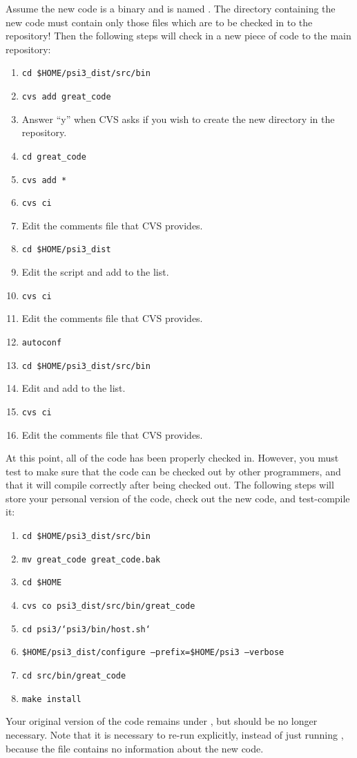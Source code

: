Assume the new code is a binary and is named . The directory
containing the new code must contain only those files which are to be checked
in to the repository! Then the following steps will check in a new
piece of code to the main repository:
\begin{enumerate}
\item {\tt cd \$HOME/psi3\_dist/src/bin}
\item {\tt cvs add great\_code}
\item Answer ``y'' when CVS asks if you wish to create the new directory in
the repository. 
\item {\tt cd great\_code}
\item {\tt cvs add *}
\item {\tt cvs ci}
\item Edit the comments file that CVS provides. 
\item {\tt cd \$HOME/psi3\_dist}
\item Edit the  script and add  to the list. 
\item {\tt cvs ci}
\item Edit the comments file that CVS provides. 
\item {\tt autoconf} 
\item {\tt cd \$HOME/psi3\_dist/src/bin} 
\item Edit  and add  to the list. 
\item {\tt cvs ci}
\item Edit the comments file that CVS provides. 
\end{enumerate}
At this point, all of the code has been properly checked in. However, you must
test to make sure that the code can be checked out by other programmers, and
that it will compile correctly after being checked out. The following steps will
store your personal version of the code, check out the new code, and
test-compile it:
\begin{enumerate}
\item {\tt cd \$HOME/psi3\_dist/src/bin}
\item {\tt mv great\_code great\_code.bak}
\item {\tt cd \$HOME}
\item {\tt cvs co psi3\_dist/src/bin/great\_code}
\item {\tt cd psi3/`psi3/bin/host.sh`}
\item {\tt \$HOME/psi3\_dist/configure --prefix=\$HOME/psi3 --verbose}
\item {\tt cd src/bin/great\_code}
\item {\tt make install}
\end{enumerate}
Your original version of the code remains under , but should be
no longer necessary. Note that it is necessary to re-run  explicitly,
instead of just running , because the  file
contains no information about the new code.

